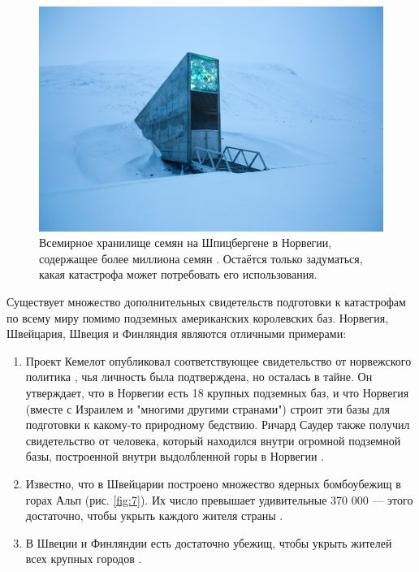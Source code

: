 \documentclass[10pt,twocolumn,letterpaper]{article}
\begin{document}
\begin{figure}[t]
\begin{center}
   \includegraphics[width=1\linewidth]{svalbard.jpg}
\end{center}
   \caption{Всемирное хранилище семян на Шпицбергене в Норвегии, содержащее более миллиона семян \cite{24}. Остаётся только задуматься, какая катастрофа может потребовать его использования.}
\label{fig:8}
\label{fig:onecol}
\end{figure}

Существует множество дополнительных свидетельств подготовки к катастрофам по всему миру помимо подземных американских королевских баз. Норвегия, Швейцария, Швеция и Финляндия являются отличными примерами:

\begin{flushleft}
\begin{enumerate}
    \item Проект Кемелот опубликовал соответствующее свидетельство от норвежского политика \cite{25,26}, чья личность была подтверждена, но осталась в тайне. Он утверждает, что в Норвегии есть 18 крупных подземных баз, и что Норвегия (вместе с Израилем и "многими другими странами") строит эти базы для подготовки к какому-то природному бедствию. Ричард Саудер также получил свидетельство от человека, который находился внутри огромной подземной базы, построенной внутри выдолбленной горы в Норвегии \cite{22}.
    \item Известно, что в Швейцарии построено множество ядерных бомбоубежищ в горах Альп (рис. \ref{fig:7}). Их число превышает удивительные 370 000 — этого достаточно, чтобы укрыть каждого жителя страны \cite{27}.
    \item В Швеции и Финляндии есть достаточно убежищ, чтобы укрыть жителей всех крупных городов \cite{27}. 
\end{enumerate}
\end{flushleft}
\end{document}
